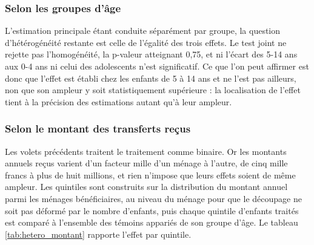 \subsubsection{Selon les groupes d'âge}

L'estimation principale étant conduite séparément par groupe, la question
d'hétérogénéité restante est celle de l'égalité des trois effets. Le test
joint ne rejette pas l'homogénéité, la p-valeur atteignant 0,75, et ni
l'écart des 5-14 ans aux 0-4 ans ni celui des adolescents n'est
significatif. Ce que l'on peut affirmer est donc que l'effet est établi
chez les enfants de 5 à 14 ans et ne l'est pas ailleurs, non que son
ampleur y soit statistiquement supérieure : la localisation de l'effet
tient à la précision des estimations autant qu'à leur ampleur.

\subsubsection{Selon le montant des transferts reçus}
\label{subsec:hetero_montant}

Les volets précédents traitent le traitement comme binaire. Or les
montants annuels reçus varient d'un facteur mille d'un ménage à l'autre,
de cinq mille francs à plus de huit millions, et rien n'impose que leurs
effets soient de même ampleur. Les quintiles sont construits sur la
distribution du montant annuel parmi les ménages bénéficiaires, au niveau
du ménage pour que le découpage ne soit pas déformé par le nombre
d'enfants, puis chaque quintile d'enfants traités est comparé à l'ensemble
des témoins appariés de son groupe d'âge. Le tableau
\ref{tab:hetero_montant} rapporte l'effet par quintile.

